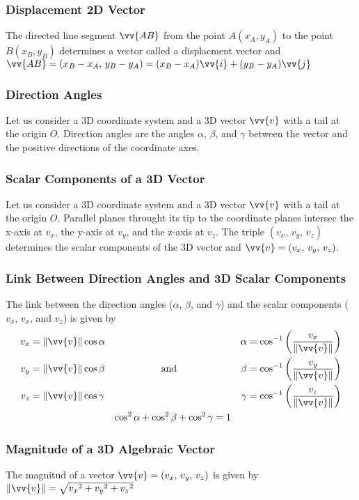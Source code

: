 \documentclass{article}
\newcommand{\mv}[1]{
	\lVert\vv{#1}\rVert
}
\begin{document}
	\subsubsection{Displacement 2D Vector}
	The directed line segment $\vv{AB}$ from the point $A(x_A, y_A)$ to the point $B(x_B, y_B)$ determines a vector called a displacment vector and $\vv{AB}=(x_B-x_A,\,y_B-y_A)=(x_B-x_A)\vv{i}+(y_B-y_A)\vv{j}$
	\subsubsection{Direction Angles}
	Let us consider a 3D coordinate system and a 3D vector $\vv{v}$ with a tail at the origin $O$. Direction angles are the angles $\alpha$, $\beta$, and $\gamma$ between the vector and the positive directions of the coordinate axes. %
	\subsubsection{Scalar Components of a 3D Vector}
	Let us consider a 3D coordinate system and a 3D vector $\vv{v}$ with a tail at the origin $O$. Parallel planes throught its tip to the coordinate planes intersec the x-axis at $v_x$, the y-axis at $v_y$, and the z-axis at $v_z$. The triple $(v_x,\,v_y,\,v_z)$ determines the scalar components of the 3D vector and $\vv{v}=(v_x,\,v_y,\,v_z)$. %
	\subsubsection{Link Between Direction Angles and 3D Scalar Components}
	The link between the direction angles ($\alpha$, $\beta$, and $\gamma$) and the scalar components ($v_x$, $v_x$, and $v_z$) is given by
	\begin{align*}
		v_x&=\mv{v}\cos\alpha&&&\alpha&=\cos^{-1}\left(\frac{v_x}{\mv{v}}\right)\\
		v_y&=\mv{v}\cos\beta&\text{and}&&\beta&=\cos^{-1}\left(\frac{v_y}{\mv{v}}\right)\\
		v_z&=\mv{v}\cos\gamma&&&\gamma&=\cos^{-1}\left(\frac{v_z}{\mv{v}}\right)\\
		&&\cos^2\alpha+\cos^2\beta&+\cos^2\gamma=1
	\end{align*}
	\subsubsection{Magnitude of a 3D Algebraic Vector}
	The magnitud of a vector $\vv{v}=(v_x,\,v_y,\,v_z)$ is given by $\mv{v}=\sqrt{{v_x}^2+{v_y}^2+{v_z}^2}$
\end{document}
